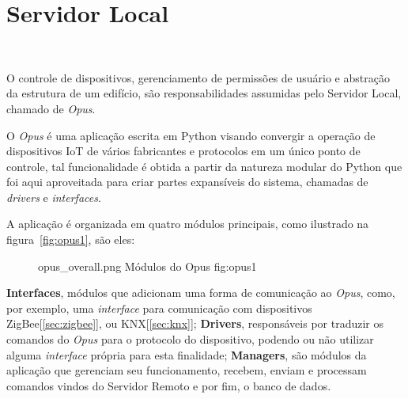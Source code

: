 \section{\textbf{Servidor Local}}
~\label{opus}

O controle de dispositivos, gerenciamento de permissões de usuário e abstração da estrutura de um edifício,
são responsabilidades assumidas pelo Servidor Local, chamado de \emph{Opus}.

O \emph{Opus} é uma aplicação escrita em Python visando convergir a operação de dispositivos IoT de vários
fabricantes e protocolos em um único ponto de controle, tal funcionalidade é obtida a partir da natureza modular
do Python que foi aqui aproveitada para criar partes expansíveis do sistema, chamadas de \emph{drivers} e \emph{interfaces}.

A aplicação é organizada em quatro módulos principais, como ilustrado na figura~\ref{fig:opus1}, são eles:
\begin{figure}[h!]
    {opus_overall.png}
    {Módulos do Opus}
    {fig:opus1}
\end{figure}

\textbf{Interfaces}, módulos que adicionam uma forma de comunicação ao \emph{Opus}, como, por exemplo, uma \emph{interface} para comunicação com 
dispositivos ZigBee[\ref{sec:zigbee}], ou KNX[\ref{sec:knx}]; \textbf{Drivers}, responsáveis por traduzir os comandos do \emph{Opus} para o 
protocolo do dispositivo, podendo ou não utilizar alguma \emph{interface} própria para esta finalidade; \textbf{Managers}, são módulos da aplicação 
que gerenciam seu funcionamento, recebem, enviam e processam comandos vindos do Servidor Remoto e por fim, o banco de dados.





